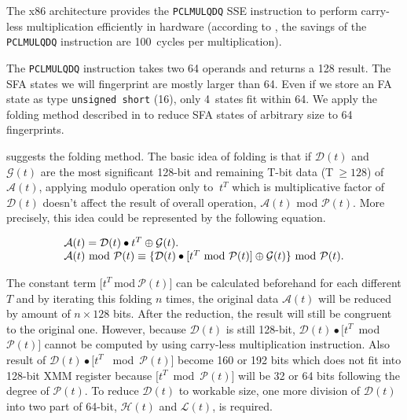 \documentclass[10pt, conference, compsocconf]{IEEEtran}
\begin{document}
The x86 architecture provides the {\tt PCLMULQDQ} SSE instruction to perform
carry-less multiplication efficiently in hardware (according to
\cite{IntelCarryless}, the savings of the {\tt PCLMULQDQ}
instruction are
100~cycles per multiplication).

The {\tt PCLMULQDQ} instruction takes two
\SI{64}{\bit} operands and returns a \SI{128}{\bit} result.
The SFA states we will fingerprint are mostly larger than \SI{64}{\bit}.
Even if we store
an FA state as type {\tt unsigned short} (\SI{16}{\bit}), only 4~states fit
within \SI{64}{\bit}. We apply the folding method
described in \cite{IntelCRC} to reduce SFA states of arbitrary
size to \SI{64}{\bit} fingerprints.

\iffalse
suggests the folding method. The basic idea of
folding is that if $\mathcal{D}(t)$ and $\mathcal{G}(t)$ are the most
significant 128-bit and remaining T-bit data (T$~\geq128$) of $\mathcal{A}(t)$,
applying modulo operation only to $~t^T$ which is multiplicative
factor of $\mathcal{D}(t)$ doesn't affect the result of overall
operation, $\mathcal{A}(t)$ mod $\mathcal{P}(t)$. More precisely,
this idea could be represented by the following equation.

\begin{equation}
\centering
\begin{tabular}{l}
    $\mathcal{A}(t)=\mathcal{D}(t)\bullet t^T\oplus\mathcal{G}(t).$ \\
    $\mathcal{A}(t)$~mod~$\mathcal{P}(t)\equiv\{\mathcal{D}(t)\bullet[t^T$~mod~$\mathcal{P}(t)]\oplus\mathcal{G}(t)\}$ mod $\mathcal{P}(t)$.
\end{tabular}
\label{eq:foldingIdea}
\end{equation}

The constant term $[t^T~$mod$~\mathcal{P}(t)]$ can be calculated
beforehand for each different $T$ and by iterating this folding $n$
times, the original data $\mathcal{A}(t)$ will be reduced by amount
of $n\times128$ bits. After the reduction, the result will still
be congruent to the original one. However, because
$\mathcal{D}(t)$ is still 128-bit, $\mathcal{D}(t)\bullet[t^T$~mod~
$\mathcal{P}(t)]$ cannot be computed by using carry-less
multiplication instruction. Also result of $\mathcal{D}(t)\bullet[t^T$
~mod~$\mathcal{P}(t)]$ become 160 or 192 bits which does not fit
into 128-bit XMM register because
$[t^T$~mod~$\mathcal{P}(t)]$ will be 32 or 64 bits following the
degree of $\mathcal{P}(t)$. To reduce $\mathcal{D}(t)$ to workable size,
one more division of $\mathcal{D}(t)$ into two part of 64-bit,
$\mathcal{H}(t)$ and $\mathcal{L}(t)$, is required.
\end{document}
